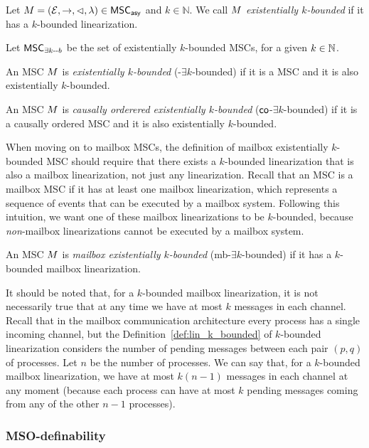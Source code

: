 \documentclass{article}
\begin{document}
\begin{definition}\label{def:ek_bounded_msc}
	Let $M = (\mathcal{E}, \rightarrow, \lhd, \lambda) \in \mathsf{MSC}_{\mathsf{asy}}$ and $k \in \mathbb{N}$. We call $M$ \emph{existentially $k$-bounded} if it has a $k$-bounded linearization.
\end{definition}
Let $\mathsf{MSC}_{\exists k\text{-}\text{-}b}$ be the set of existentially $k$-bounded MSCs, for a given $k \in \mathbb{N}$.
\begin{definition}
	An MSC $M$ is \emph{\pp existentially $k$-bounded} (\pp-$\exists k$-bounded) if it is a \pp MSC and it is also existentially $k$-bounded.
\end{definition}
\begin{definition}
	An MSC $M$ is \emph{causally orderered existentially $k$-bounded} ($\mathsf{co}$-$\exists k$-bounded) if it is a causally ordered MSC and it is also existentially $k$-bounded.
\end{definition}
When moving on to mailbox MSCs, the definition of mailbox existentially $k$-bounded MSC should require that there exists a $k$-bounded linearization that is also a mailbox linearization, not just any linearization. Recall that an MSC is a mailbox MSC if it has at least one mailbox linearization, which represents a sequence of events that can be executed by a mailbox system. Following this intuition, we want one of these mailbox linearizations to be $k$-bounded, because \emph{non}-mailbox linearizations cannot be executed by a mailbox system.
\begin{definition}
	An MSC $M$ is \emph{mailbox existentially $k$-bounded} (mb-$\exists k$-bounded) if it has a $k$-bounded mailbox linearization.
\end{definition}
It should be noted that, for a $k$-bounded mailbox linearization, it is not necessarily true that at any time we have at most $k$ messages in each channel. Recall that in the mailbox communication architecture every process has a single incoming channel, but the Definition~\ref{def:lin_k_bounded} of $k$-bounded linearization considers the number of pending messages between each pair $(p,q)$ of processes. Let $n$ be the number of processes. We can say that, for a $k$-bounded mailbox linearization, we have at most $k(n-1)$ messages in each channel at any moment (because each process can have at most $k$ pending messages coming from any of the other $n-1$ processes).

\subsubsection{MSO-definability}
\end{document}
